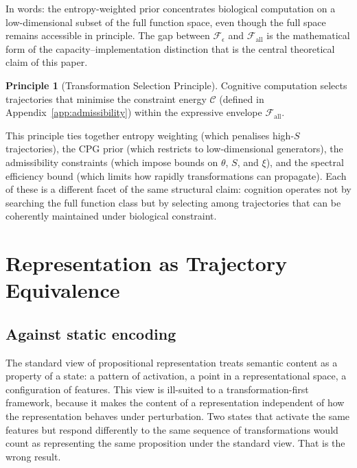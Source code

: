 \documentclass[12pt, a4paper]{article}
\theoremstyle{remark}
\theoremstyle{definition}
\newtheorem{principle}[theorem]{Principle}
\begin{document}
In words: the entropy-weighted prior concentrates biological computation on a
low-dimensional subset of the full function space, even though the full space remains
accessible in principle.  The gap between $\mathcal{F}_\epsilon$ and $\mathcal{F}_{\mathrm{all}}$
is the mathematical form of the capacity--implementation distinction that is the central
theoretical claim of this paper.

\begin{principle}[Transformation Selection Principle]
\label{prin:selection}
Cognitive computation selects trajectories that minimise the constraint energy $\mathcal{C}$
(defined in Appendix~\ref{app:admissibility}) within the expressive envelope
$\mathcal{F}_{\mathrm{all}}$.
\end{principle}

This principle ties together entropy weighting (which penalises high-$S$ trajectories),
the CPG prior (which restricts to low-dimensional generators), the admissibility constraints
(which impose bounds on $\theta$, $S$, and $\xi$), and the spectral efficiency bound (which
limits how rapidly transformations can propagate).  Each of these is a different facet of
the same structural claim: cognition operates not by searching the full function class but
by selecting among trajectories that can be coherently maintained under biological
constraint.

\section{Representation as Trajectory Equivalence}
\label{sec:representation}

\subsection{Against static encoding}

The standard view of propositional representation treats semantic content as a property of
a state: a pattern of activation, a point in a representational space, a configuration of
features.  This view is ill-suited to a transformation-first framework, because it makes
the content of a representation independent of how the representation behaves under
perturbation.  Two states that activate the same features but respond differently to the
same sequence of transformations would count as representing the same proposition under
the standard view.  That is the wrong result.
\end{document}
